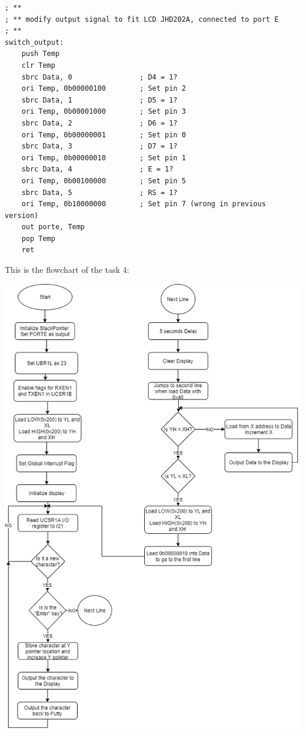 \documentclass[a4paper,12pt]{article}
\begin{document}
\begin{lstlisting}
; **
; ** modify output signal to fit LCD JHD202A, connected to port E
; **
switch_output:
	push Temp
	clr Temp
	sbrc Data, 0				; D4 = 1?
	ori Temp, 0b00000100		; Set pin 2 
	sbrc Data, 1				; D5 = 1?
	ori Temp, 0b00001000		; Set pin 3 
	sbrc Data, 2				; D6 = 1?
	ori Temp, 0b00000001		; Set pin 0 
	sbrc Data, 3				; D7 = 1?
	ori Temp, 0b00000010		; Set pin 1 
	sbrc Data, 4				; E = 1?
	ori Temp, 0b00100000		; Set pin 5 
	sbrc Data, 5				; RS = 1?
	ori Temp, 0b10000000		; Set pin 7 (wrong in previous version)
	out porte, Temp
	pop Temp
	ret
\end{lstlisting}

\newpage
This is the flowchart of the task 4:
\begin{center}
\includegraphics[scale=0.6]{img/Task4.png}
\end{center}


\end{document}
